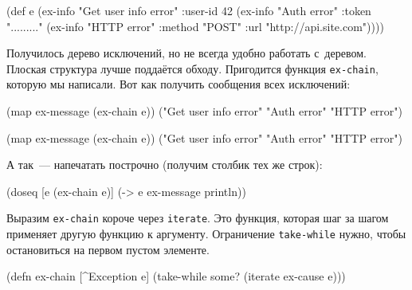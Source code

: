 \else

\begin{english}
  \begin{clojure}
(def e
  (ex-info
   "Get user info error"
   {:user-id 42}
   (ex-info "Auth error"
            {:token "........."}
            (ex-info "HTTP error"
                     {:method "POST"
                      :url "http://api.site.com"}))))
  \end{clojure}
\end{english}

\fi


Получилось дерево исключений, но не всегда удобно работать с~деревом. Плоская
структура лучше поддаётся обходу. Пригодится функция \verb|ex-chain|, которую
мы написали. Вот как получить сообщения всех исключений:

\ifx\DEVICETYPE\MOBILE

\begin{english}
  \begin{clojure}
(map ex-message (ex-chain e))
("Get user info error"
 "Auth error" "HTTP error")
  \end{clojure}
\end{english}

\else

\begin{english}
  \begin{clojure}
(map ex-message (ex-chain e))
("Get user info error" "Auth error" "HTTP error")
  \end{clojure}
\end{english}

\fi

\noindent
А так~--- напечатать построчно (получим столбик тех же строк):


\begin{english}
  \begin{clojure}
(doseq [e (ex-chain e)]
  (-> e ex-message println))
  \end{clojure}
\end{english}

Выразим \verb|ex-chain| короче через \verb|iterate|. Это функция, которая
шаг за шагом применяет другую функцию к аргументу. Ограничение
\verb|take-while| нужно, чтобы остановиться на первом пустом элементе.

\ifx\DEVICETYPE\MOBILE

\begin{english}
  \begin{clojure}
(defn ex-chain [^Exception e]
  (take-while some?
    (iterate ex-cause e)))
  \end{clojure}
\end{english}

